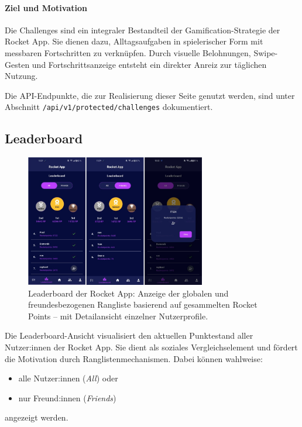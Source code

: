 \documentclass[11pt,a4paper]{article}
\begin{document}
\paragraph{Ziel und Motivation}
Die Challenges sind ein integraler Bestandteil der Gamification-Strategie der Rocket App. Sie dienen dazu, Alltagsaufgaben in spielerischer Form mit messbaren Fortschritten zu verknüpfen. Durch visuelle Belohnungen, Swipe-Gesten und Fortschrittsanzeige entsteht ein direkter Anreiz zur täglichen Nutzung.

\vspace{1em}
Die API-Endpunkte, die zur Realisierung dieser Seite genutzt werden, sind unter Abschnitt \texttt{/api/v1/protected/challenges} dokumentiert.

\subsection{Leaderboard}

\begin{figure}[H]
    \centering
    \includegraphics[width=0.7\textwidth]{images/apps/leaderboard.jpg}
    \caption{Leaderboard der Rocket App: Anzeige der globalen und freundesbezogenen Rangliste basierend auf gesammelten Rocket Points – mit Detailansicht einzelner Nutzerprofile.}
    \label{fig:validation-workflow}
\end{figure}

Die Leaderboard-Ansicht visualisiert den aktuellen Punktestand aller Nutzer:innen der Rocket App. Sie dient als soziales Vergleichselement und fördert die Motivation durch Ranglistenmechanismen. Dabei können wahlweise:
\begin{itemize}
    \item alle Nutzer:innen (\textit{All}) oder
    \item nur Freund:innen (\textit{Friends})
\end{itemize}
angezeigt werden.
\end{document}
